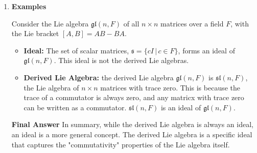 \documentclass[12pt,a4paper]{report}
\begin{document}
\begin{remark}
\begin{enumerate}[label=Step \arabic*:]
	\item \textbf{Examples}
	
	Consider the Lie algebra $\mathfrak{gl}(n,F)$ of all $n \times n$ matrices over a field $F$, with the Lie bracket $[A,B]=AB-BA$.
	\begin{itemize}
		\item \textbf{Ideal: }The set of scalar matrices, $\mathfrak{s}=\{cI\,|\, c\in F\}$, forms an ideal of $\mathfrak{gl}(n,F)$.  This ideal is not the derived Lie algebras.
		\item \textbf{Derived Lie Algebra:} the derived Lie algebra $\mathfrak{gl}(n,F)$ is $\mathfrak{sl}(n,F)$, the Lie algebra of $n\times n$ matrices with trace zero.  This is because the trace of a commutator is always zero, and any matricx with trace zero can be written as a commutator.  $\mathfrak{sl}(n,F)$ is an ideal of $\mathfrak{gl}(n,F)$.
	\end{itemize}
	
	\textbf{Final Answer}  In summary, while the derived Lie algebra is always an ideal, an ideal is a more general concept. The derived Lie algebra is a specific ideal that captures the "commutativity" properties of the Lie algebra itself.

\end{enumerate}

\end{remark}
\end{document}
